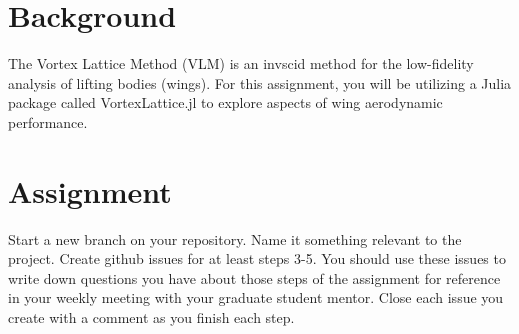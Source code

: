 \documentclass[12pt]{article}
\begin{document}
	
\section{Background}

	The Vortex Lattice Method (VLM) is an invscid method for the low-fidelity analysis of lifting bodies (wings).
	For this assignment, you will be utilizing a Julia package called VortexLattice.jl to explore aspects of wing aerodynamic performance.
	
	
\section{Assignment}
Start a new branch on your repository. Name it something relevant to the project. Create github issues for at least steps 3-5. You should use these issues to write down questions you have about those steps of the assignment for reference in your weekly meeting with your graduate student mentor. Close each issue you create with a comment as you finish each step. 
\end{document}
